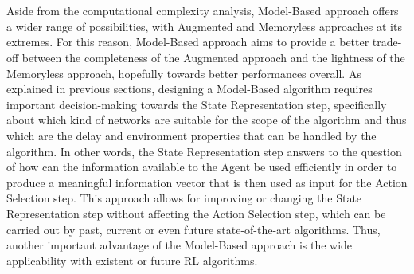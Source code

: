                 \\\\
                Aside from the computational complexity analysis, Model-Based approach offers a wider range of possibilities, with Augmented and Memoryless approaches at its extremes. For this reason, Model-Based approach aims to provide a better trade-off between the completeness of the Augmented approach and the lightness of the Memoryless approach, hopefully towards better performances overall. As explained in previous sections, designing a Model-Based algorithm requires important decision-making towards the State Representation step, specifically about which kind of networks are suitable for the scope of the algorithm and thus which are the delay and environment properties that can be handled by the algorithm. In other words, the State Representation step answers to the question of how can the information available to the Agent be used efficiently in order to produce a meaningful information vector that is then used as input for the Action Selection step. This approach allows for improving or changing the State Representation step without affecting the Action Selection step, which can be carried out by past, current or even future state-of-the-art algorithms. Thus, another important advantage of the Model-Based approach is the wide applicability with existent or future RL algorithms.
                
                    
                    
                    
                    
